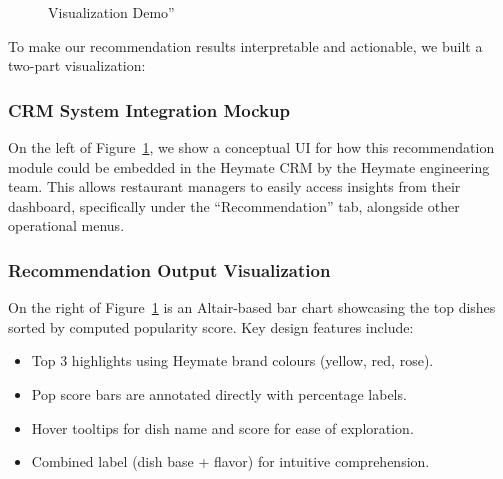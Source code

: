 \documentclass[
  11pt,
  a4paper,
  DIV=11,
  numbers=noendperiod]{scrartcl}
\providecommand{\tightlist}{%
  \setlength{\itemsep}{0pt}\setlength{\parskip}{0pt}}\usepackage{longtable,booktabs,array}
\begin{document}
\begin{figure}

\caption{\label{fig-viz-demo}Visualization Demo''}


\end{figure}%

To make our recommendation results interpretable and actionable, we
built a two-part visualization:

\subsubsection{CRM System Integration
Mockup}\label{crm-system-integration-mockup}

On the left of Figure~\ref{fig-viz-demo}, we show a conceptual UI for
how this recommendation module could be embedded in the Heymate CRM by
the Heymate engineering team. This allows restaurant managers to easily
access insights from their dashboard, specifically under the
``Recommendation'' tab, alongside other operational menus.

\subsubsection{Recommendation Output
Visualization}\label{recommendation-output-visualization}

On the right of Figure~\ref{fig-viz-demo} is an Altair-based bar chart
showcasing the top dishes sorted by computed popularity score. Key
design features include:

\begin{itemize}
\tightlist
\item
  Top 3 highlights using Heymate brand colours (yellow, red, rose).
\item
  Pop score bars are annotated directly with percentage labels.
\item
  Hover tooltips for dish name and score for ease of exploration.
\item
  Combined label (dish base + flavor) for intuitive comprehension.
\end{itemize}
\end{document}
